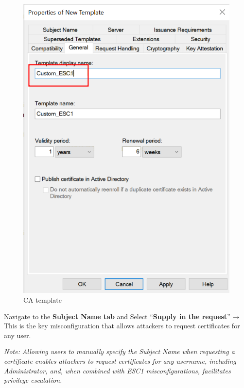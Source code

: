\begin{figure}
    \centering
    \includegraphics[width=0.75\linewidth]{customesc1.png}
    \caption{CA template}
    \label{fig:placeholder}
\end{figure}

Navigate to the \textbf{Subject Name tab} and Select “\textbf{Supply in the request}” → This is the key misconfiguration that allows attackers to request certificates for any user.

\textit{Note: }\textit{Allowing users to manually specify the Subject Name when requesting a certificate enables attackers to request certificates for any username, including Administrator, and, when combined with ESC1 misconfigurations, facilitates privilege escalation.}

